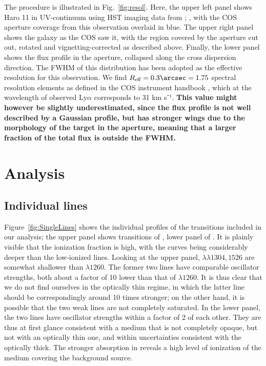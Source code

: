 \documentclass[twocolumn, trackchanges]{aastex61}
\begin{document}
The procedure is illustrated in Fig.~\ref{fig:resol}. Here, the upper left panel
shows Haro 11 in UV-continuum using HST imaging data from \citet{Ostlin2009};
\citet{Hayes2009}, with the COS aperture coverage from this observation overlaid
in blue. The upper right panel shows the galaxy as the COS saw it, with the
region covered by the aperture cut out, rotated and vignetting-corrected as
described above.  Finally, the lower panel shows the flux profile in the
aperture, collapsed along the cross dispersion direction. The FWHM of this
distribution has been adopted as the effective resolution for this observation.
We find $R_{\text{eff}} = 0.3 \arcsec = 1.75$ spectral resolution elements as
defined in the COS instrument handbook \cite{CosHandbook}, which at the
wavelength of observed Ly$\alpha$ corresponds to 31 km s⁻¹. \textbf{This value
might however be slightly underestimated, since the flux profile is not well 
described by a Gaussian profile, but has stronger wings due to the morphology of 
the target in the aperture, meaning that a larger fraction of the total flux is 
outside the FWHM.}

\section{Analysis}\label{analysis}

\subsection{Individual lines}\label{individual-lines}

Figure~\ref{fig:SingleLines} shows the individual profiles of the
transitions included in our analysis; the upper panel shows transitions
of , lower panel of . It is plainly visible that
the ionization fraction is high, with the  curves being
considerably deeper than the low-ionized lines. Looking at the upper
panel,  $\lambda \lambda 1304, 1526$ are somewhat shallower
than  $\lambda 1260$. The former two lines have comparable
oscillator strengths, both about a factor of 10 lower than that of
$\lambda 1260$. It is thus clear that we do not find ourselves in the
optically thin regime, in which the latter line should be
correspondingly around 10 times stronger; on the other hand, it is
possible that the two weak lines are not completely saturated. In the
lower panel, the two  lines have oscillator strengths within
a factor of 2 of each other. They are thus at first glance consistent
with a medium that is not completely opaque, but not with an optically
thin one, and within uncertainties consistent with the optically thick.
The stronger absorption in  reveals a high level of
ionization of the medium covering the background source.
\end{document}
